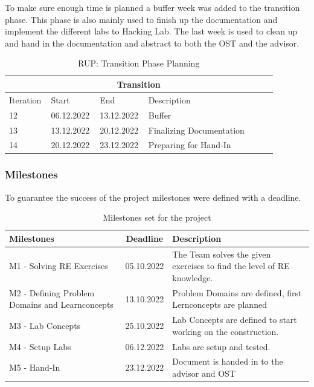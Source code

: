 \noindent To make sure enough time is planned a buffer week was added to the transition phase. This phase is also mainly used to finish up the documentation and implement the different labs to Hacking Lab. The last week is used to clean up and hand in the documentation and abstract to both the OST and the advisor.
\begin{table}[H]
    \centering
    \begin{tabular}{|p{0.12\linewidth}|p{0.15\linewidth}|p{0.15\linewidth}|p{0.46\linewidth}|}
        \hline
        \multicolumn{4}{||c||}{\textbf{Transition}} \\
        \hline \hline
        Iteration & Start & End & Description \\
        \hline \hline
        12 & 06.12.2022 & 13.12.2022 & Buffer \\
        \hline
        13 & 13.12.2022 & 20.12.2022 & Finalizing Documentation \\
        \hline
        14 & 20.12.2022 & 23.12.2022 & Preparing for Hand-In \\
        \hline
    \end{tabular}
    \caption{RUP: Transition Phase Planning}
    \label{transition_table}
\end{table}

\subsubsection*{Milestones}
To guarantee the success of the project milestones were defined with a deadline.

\begin{table}[H]
    \centering
    \begin{tabular}[]{|| p{5cm} | c | p{6.2cm} ||}
        \hline
        Milestones & Deadline & Description \\
        \hline \hline
        M1 - Solving RE Exercises & 05.10.2022 & The Team solves the given exercises to find the level of RE knowledge. \\
        \hline
        M2 - Defining Problem Domains and Learnconcepts& 13.10.2022 & Problem Domains are defined, first Lernconcepts are planned \\
        \hline
        M3 - Lab Concepts & 25.10.2022 & Lab Concepts are defined to start working on the construction. \\
        \hline
        M4 - Setup Labs & 06.12.2022 & Labs are setup and tested. \\
        \hline
        M5 - Hand-In & 23.12.2022 & Document is handed in to the advisor and OST \\
        \hline
    \end{tabular}
    \caption{Milestones set for the project}
    \label{milestones_table}
\end{table}

